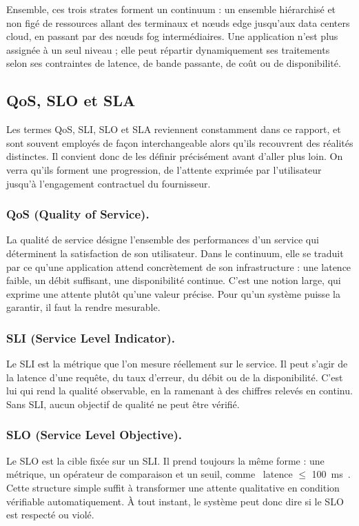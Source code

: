 Ensemble, ces trois strates forment un continuum : un ensemble hiérarchisé et non figé de ressources allant des terminaux et nœuds edge jusqu'aux data centers cloud, en passant par des nœuds fog intermédiaires. Une application n'est plus assignée à un seul niveau ; elle peut répartir dynamiquement ses traitements selon ses contraintes de latence, de bande passante, de coût ou de disponibilité.

\subsection{QoS, SLO et SLA}
\label{sec:qos-slo-sla}
Les termes QoS, SLI, SLO et SLA reviennent constamment dans ce rapport, et sont souvent employés de façon interchangeable alors qu'ils recouvrent des réalités distinctes. Il convient donc de les définir précisément avant d'aller plus loin. On verra qu'ils forment une progression, de l'attente exprimée par l'utilisateur jusqu'à l'engagement contractuel du fournisseur.

\subsubsection{QoS (Quality of Service).} La qualité de service désigne l'ensemble des performances d'un service qui déterminent la satisfaction de son utilisateur. Dans le continuum, elle se traduit par ce qu'une application attend concrètement de son infrastructure : une latence faible, un débit suffisant, une disponibilité continue. C'est une notion large, qui exprime une attente plutôt qu'une valeur précise. Pour qu'un système puisse la garantir, il faut la rendre mesurable.

\subsubsection{SLI (Service Level Indicator).} Le SLI est la métrique que l'on mesure réellement sur le service. Il peut s'agir de la latence d'une requête, du taux d'erreur, du débit ou de la disponibilité. C'est lui qui rend la qualité observable, en la ramenant à des chiffres relevés en continu. Sans SLI, aucun objectif de qualité ne peut être vérifié.

\subsubsection{SLO (Service Level Objective).} Le SLO est la cible fixée sur un SLI. Il prend toujours la même forme : une métrique, un opérateur de comparaison et un seuil, comme \og~latence $\leq$ 100~ms~\fg{}. Cette structure simple suffit à transformer une attente qualitative en condition vérifiable automatiquement. À tout instant, le système peut donc dire si le SLO est respecté ou violé.

